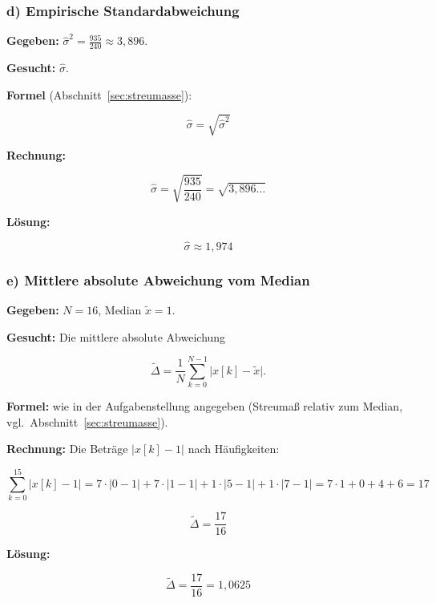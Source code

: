 \subsubsection*{d) Empirische Standardabweichung}

\begin{beispiel}

\textbf{Gegeben:} $\hat{\sigma}^2 = \tfrac{935}{240} \approx 3{,}896$.

\textbf{Gesucht:} $\hat{\sigma}$.

\textbf{Formel} (Abschnitt~\ref{sec:streumasse}):

$$
\hat{\sigma} = \sqrt{\hat{\sigma}^2}
$$

\textbf{Rechnung:}

$$
\hat{\sigma} = \sqrt{\frac{935}{240}} = \sqrt{3{,}896\ldots}
$$

\textbf{Lösung:}

$$
\boxed{\;\hat{\sigma} \approx 1{,}974\;}
$$

\end{beispiel}

\subsubsection*{e) Mittlere absolute Abweichung vom Median}

\begin{beispiel}

\textbf{Gegeben:} $N = 16$, Median $\tilde{x} = 1$.

\textbf{Gesucht:} Die mittlere absolute Abweichung

$$
\tilde{\Delta} = \frac{1}{N} \sum_{k=0}^{N-1} \bigl| x[k] - \tilde{x} \bigr|.
$$

\textbf{Formel:} wie in der Aufgabenstellung angegeben (Streumaß relativ zum
Median, vgl.\ Abschnitt~\ref{sec:streumasse}).

\textbf{Rechnung:} Die Beträge $|x[k] - 1|$ nach Häufigkeiten:

$$
\sum_{k=0}^{15} |x[k] - 1|
= 7\cdot|0-1| + 7\cdot|1-1| + 1\cdot|5-1| + 1\cdot|7-1|
= 7\cdot 1 + 0 + 4 + 6 = 17
$$

$$
\tilde{\Delta} = \frac{17}{16}
$$

\textbf{Lösung:}

$$
\boxed{\;\tilde{\Delta} = \frac{17}{16} = 1{,}0625\;}
$$

\end{beispiel}

